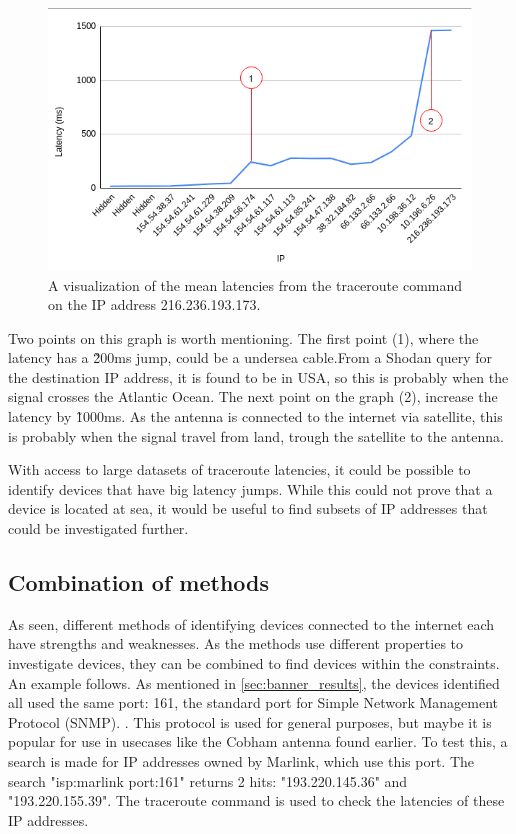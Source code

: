 \begin{figure} [H]
    \centering
    \includegraphics[scale=0.7]{Figurer/latency_graph_marked.png}
    \caption{A visualization of the mean latencies from the traceroute command on the IP address 216.236.193.173.}
    \label{fig:traceroute_graph}
\end{figure}

Two points on this graph is worth mentioning. The first point (1), where the latency has a \~200ms jump, could be a undersea cable.From a Shodan query for the destination IP address, it is found to be in USA, so this is probably when the signal crosses the Atlantic Ocean. The next point on the graph (2), increase the latency by \~1000ms. As the antenna is connected to the internet via satellite, this is probably when the signal travel from land, trough the satellite to the antenna.

With access to large datasets of traceroute latencies, it could be possible to identify devices that have big latency jumps. While this could not prove that a device is located at sea, it would be useful to find subsets of IP addresses that could be investigated further.

\subsection{Combination of methods} \label{sec:combo}
As seen, different methods of identifying devices connected to the internet each have strengths and weaknesses. As the methods use different properties to investigate devices, they can be combined to find devices within the constraints. An example follows.
As mentioned in \cref{sec:banner_results}, the devices identified all used the same port: 161, the standard port for Simple Network Management Protocol (SNMP). \cite{www_ports}. This protocol is used for general purposes, but maybe it is popular for use in usecases like the Cobham antenna found earlier. To test this, a search is made for IP addresses owned by Marlink, which use this port. The search "isp:marlink port:161" returns 2 hits: "193.220.145.36" and "193.220.155.39". The traceroute command is used to check the latencies of these IP addresses.

